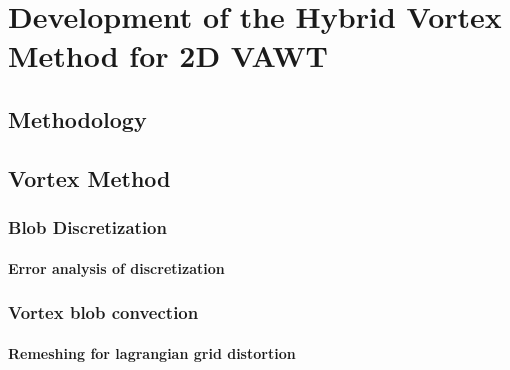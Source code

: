 \chapter{Development of the Hybrid Vortex Method for 2D VAWT}


\section{Methodology}

\section{Vortex Method}
\subsection{Blob Discretization}

\subsubsection{Error analysis of discretization}

\subsection{Vortex blob convection}

\subsubsection{Remeshing for lagrangian grid distortion}

